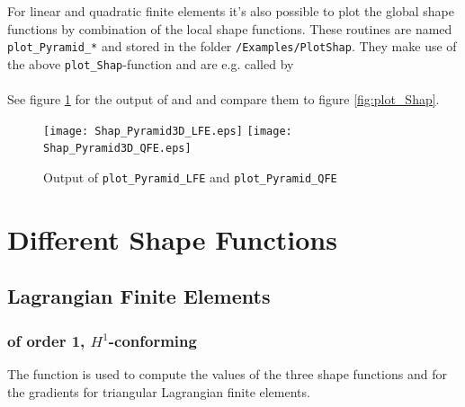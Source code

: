  For linear and quadratic finite elements it's also possible to plot the global shape functions by combination of the local shape functions. These routines are named {\tt plot\_Pyramid\_*} and stored in the folder {\tt /Examples/PlotShap}. They make use of the above {\tt plot\_Shap}-function and are e.g. called by \\

 \\

 See figure \ref{fig:plot_pyramid} for the output of  and  and compare them to figure \ref{fig:plot_Shap}.

\begin{figure}[htb]
  \centering
  \begin{minipage}[c]{0.8\textwidth}
    \texttt{[image: Shap\_Pyramid3D\_LFE.eps]} \hfill
    \texttt{[image: Shap\_Pyramid3D\_QFE.eps]}
  \end{minipage}
  \caption{Output of {\tt plot\_Pyramid\_LFE} and {\tt plot\_Pyramid\_QFE}}
  \label{fig:plot_pyramid}
\end{figure}




\section{Different Shape Functions} \label{sect:shap}



\subsection{Lagrangian Finite Elements}


\subsubsection{of order 1, $H^1$-conforming}   \label{sssect:shap_LFE}

 The function  is used to compute the values of the three shape functions and  for the gradients for triangular Lagrangian finite elements. \\

